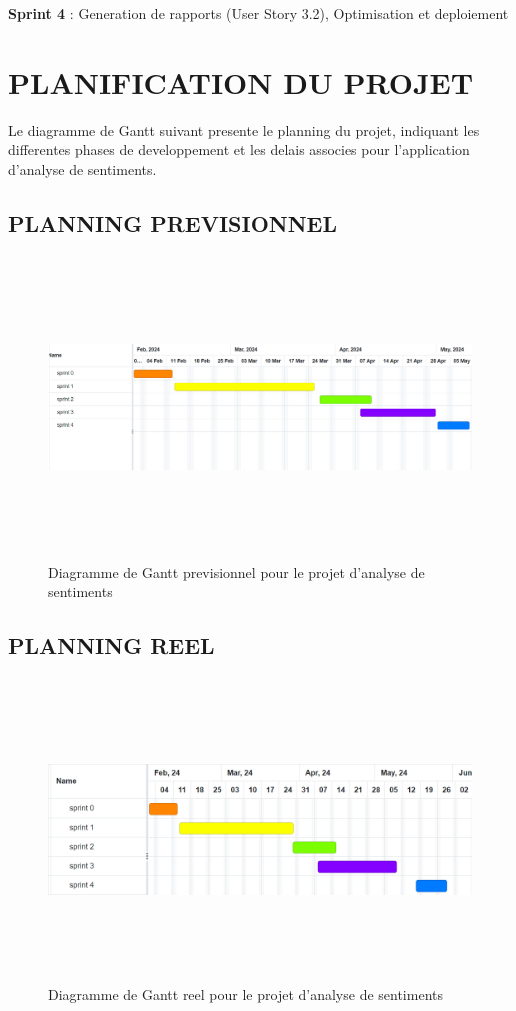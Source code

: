 \textbf{Sprint 4} : Generation de rapports (User Story 3.2), Optimisation et deploiement

\section{PLANIFICATION DU PROJET}

Le diagramme de Gantt suivant presente le planning du projet, indiquant les differentes phases de developpement et les delais associes pour l'application d'analyse de sentiments.

\subsection{PLANNING PREVISIONNEL}

\begin{figure}[H]
\centering
\includegraphics[height=8cm , width=\textwidth]{assets/images/gant-prev.png}
\caption{Diagramme de Gantt previsionnel pour le projet d'analyse de sentiments}
\label{fig:gantt-prev}
\end{figure}

\subsection{PLANNING REEL}

\begin{figure}[H]
\centering
\includegraphics[height=8cm , width=\textwidth]{assets/images/gantt-reel.png}
\caption{Diagramme de Gantt reel pour le projet d'analyse de sentiments}
\label{fig:gantt-reel}
\end{figure}

